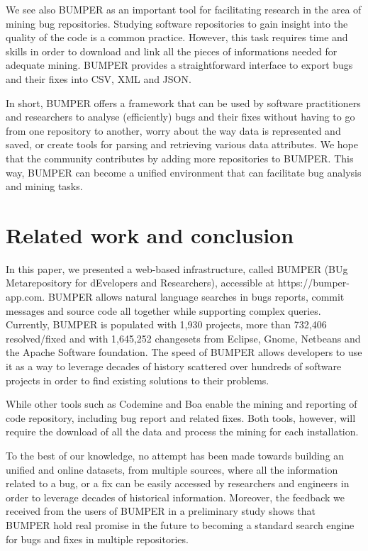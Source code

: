 \documentclass[conference]{IEEEtran}
\begin{document}
We see also BUMPER as an important tool for facilitating research in the area of mining bug repositories. Studying software repositories to gain insight into the quality of the code is a common practice. However, this task requires time and skills in order to download and link all the pieces of informations needed for adequate mining. BUMPER provides a straightforward interface to export bugs and their fixes into CSV, XML and JSON.

In short, BUMPER offers a framework that can be used by software practitioners and researchers to analyse (efficiently) bugs and their fixes without having to go from one repository to another,  worry about the way data is represented and saved, or create tools for parsing and retrieving various data attributes. We hope that the community contributes by adding more repositories to BUMPER. This way, BUMPER can become a unified environment that can facilitate bug analysis and mining tasks.

\section{Related work and conclusion}
\label{sec:conclusion}

In this paper, we presented a web-based infrastructure, called BUMPER (BUg Metarepository for dEvelopers and Researchers), accessible at https://bumper-app.com. BUMPER allows natural language searches in bugs reports, commit messages and source code all together while supporting complex queries. Currently, BUMPER is populated with  1,930 projects, more than 732,406 resolved/fixed and with 1,645,252 changesets from Eclipse, Gnome, Netbeans and the Apache Software foundation. The speed of BUMPER allows developers to use it as a way to leverage decades of history scattered over hundreds of software projects in order to find existing solutions to their problems.


While other tools such as Codemine \cite{Czerwonka2013} and Boa \cite{Bizer2011}  enable the mining and reporting of code repository, including bug report and related fixes.
Both tools, however, will require the download of all the data and process the mining for each installation.

To the best of our knowledge, no attempt has been made towards building an unified and online datasets, from multiple sources, where all the information related to a bug, or a fix can be easily accessed by researchers and engineers in order to leverage decades of historical information. Moreover, the feedback we received from the users of BUMPER in a preliminary study shows that BUMPER hold real promise in the future to becoming a standard search engine for bugs and fixes in multiple repositories.




\end{document}
